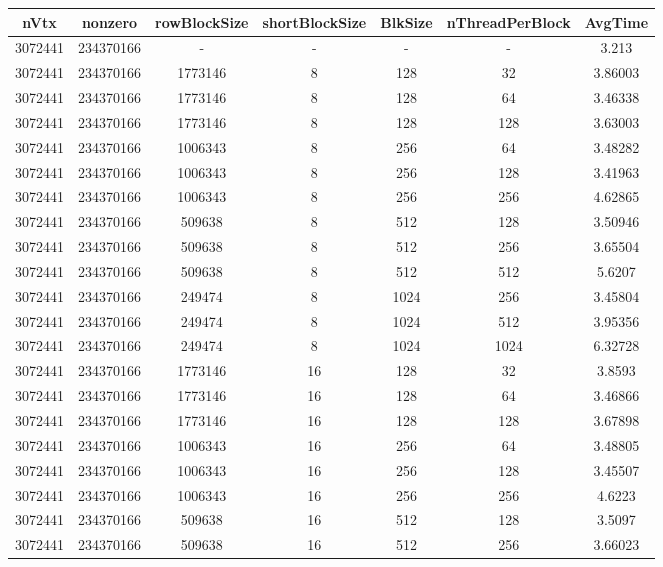 \documentclass[9pt]{article}
\begin{document}
\SetBgPosition{0.25cm,-5.0cm}
\begin{tabular}{|c|c|c|c|c|c|c| }  
\hline
nVtx  & nonzero  & rowBlockSize  & shortBlockSize  & BlkSize  & nThreadPerBlock  & AvgTime \\
\hline
3072441  & 234370166  &  -  & -  & -  & -  &3.213 \\
\hline
3072441  & 234370166  & 1773146  & 8  & 128  & 32  & 3.86003 \\
\hline
3072441  & 234370166  & 1773146  & 8  & 128  & 64  & 3.46338 \\
\hline
3072441  & 234370166  & 1773146  & 8  & 128  & 128  & 3.63003 \\
\hline
3072441  & 234370166  & 1006343  & 8  & 256  & 64  & 3.48282 \\
\hline
3072441  & 234370166  & 1006343  & 8  & 256  & 128  & 3.41963 \\
\hline
3072441  & 234370166  & 1006343  & 8  & 256  & 256  & 4.62865 \\
\hline
3072441  & 234370166  & 509638  & 8  & 512  & 128  & 3.50946 \\
\hline
3072441  & 234370166  & 509638  & 8  & 512  & 256  & 3.65504 \\
\hline
3072441  & 234370166  & 509638  & 8  & 512  & 512  & 5.6207 \\
\hline
3072441  & 234370166  & 249474  & 8  & 1024  & 256  & 3.45804 \\
\hline
3072441  & 234370166  & 249474  & 8  & 1024  & 512  & 3.95356 \\
\hline
3072441  & 234370166  & 249474  & 8  & 1024  & 1024  & 6.32728 \\
\hline
3072441  & 234370166  & 1773146  & 16  & 128  & 32  & 3.8593 \\
\hline
3072441  & 234370166  & 1773146  & 16  & 128  & 64  & 3.46866 \\
\hline
3072441  & 234370166  & 1773146  & 16  & 128  & 128  & 3.67898 \\
\hline
3072441  & 234370166  & 1006343  & 16  & 256  & 64  & 3.48805 \\
\hline
3072441  & 234370166  & 1006343  & 16  & 256  & 128  & 3.45507 \\
\hline
3072441  & 234370166  & 1006343  & 16  & 256  & 256  & 4.6223 \\
\hline
3072441  & 234370166  & 509638  & 16  & 512  & 128  & 3.5097 \\
\hline
3072441  & 234370166  & 509638  & 16  & 512  & 256  & 3.66023 \\

\end{tabular}
\end{document}
